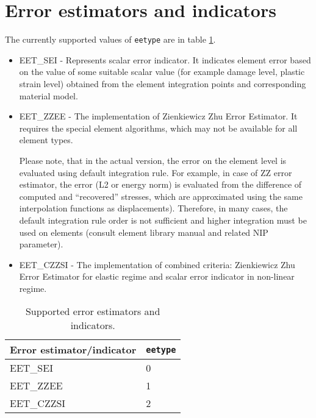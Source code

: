 \documentclass[a4paper]{report}
\newcommand{\param}[1]{\texttt{#1}} %
\begin{document}
\section{Error estimators and indicators}
\label{errorestimators}
The currently supported values of \param{eetype} are in table
\ref{eetypestable}.
\begin{itemize}
\item
EET\_SEI - Represents scalar error indicator.
It indicates element error based on the value of some suitable scalar
value (for example damage level, plastic strain level) obtained from the
element integration points and corresponding material model.
\item
EET\_ZZEE - The implementation of Zienkiewicz Zhu Error
Estimator. It requires the special element algorithms, which may not
be available for all element types.

Please note, that in the actual version, the error on the element level is evaluated using default integration rule. For example, in case of ZZ error estimator, the error (L2 or energy norm) is evaluated from the difference of computed and ``recovered'' stresses, which are approximated using the same interpolation functions as displacements). Therefore, in many cases, the default integration rule order is not sufficient and higher integration must be used on elements (consult element library manual and related NIP parameter).

\item
EET\_CZZSI - The implementation of combined criteria: Zienkiewicz Zhu Error Estimator for elastic regime and
scalar error indicator in non-linear regime.
\end{itemize}

\begin{table}[ht]
\begin{center}
\begin{tabular}{|l|l|}
\hline
Error estimator/indicator & \param{eetype}\\
\hline
EET\_SEI & 0 \\
EET\_ZZEE& 1 \\
EET\_CZZSI& 2\\
\hline
\end{tabular}
\caption{Supported error estimators and indicators.}
\label{eetypestable}
\end{center}
\end{table}
\end{document}
